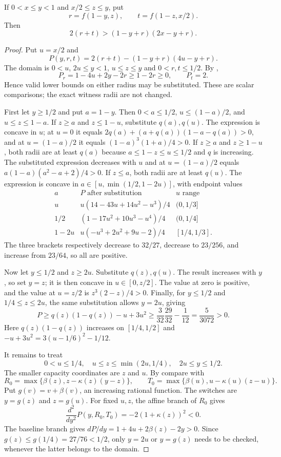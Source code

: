 \begin{lemma}
\label{lem:bc-coupled-capacity}
If $0<x\le y<1$ and $x/2\le z\le y$, put
\[
 r=f(1-y,z),\qquad t=f(1-z,x/2).
\]
Then
\[
 2(r+t)>(1-y+r)(2x-y+r).
\]
\end{lemma}
\begin{proof}
Put $u=x/2$ and
\[
 P(y,r,t)=2(r+t)-(1-y+r)(4u-y+r).
\]
The domain is $0<u$, $2u\le y<1$, $u\le z\le y$ and
$0<r,t\le1/2$. By ,
\[
 P_r=1-4u+2y-2r\ge1-2r\ge0,\qquad P_t=2.
\]
Hence valid lower bounds on either radius may be substituted. These are
scalar comparisons; the exact witness radii are not changed.

First let $y\ge1/2$ and put $a=1-y$. Then $0<a\le1/2$,
$u\le(1-a)/2$, and $u\le z\le1-a$.
If $z\ge a$ and $z\le1-u$, substitute $q(a),q(u)$.
The expression is concave in $u$; at $u=0$ it equals
$2q(a)+(a+q(a))(1-a-q(a))>0$, and at $u=(1-a)/2$ it equals
$(1-a)^3(1+a)/4>0$.
If $z\ge a$ and $z\ge1-u$, both radii are at least $q(a)$ because
$a\le1-z\le u\le1/2$ and $q$ is increasing. The substituted expression
decreases with $u$ and at $u=(1-a)/2$ equals
$a(1-a)(a^2-a+2)/4>0$.
If $z\le a$, both radii are at least $q(u)$. The expression is concave
in $a\in[u,\min(1/2,1-2u)]$, with endpoint values
\[
\begin{array}{c|c|c}
a&P\text{ after substitution}&u\text{ range}\\\hline
u&u(14-43u+14u^2-u^3)/4&(0,1/3]\\
1/2&(1-17u^2+10u^3-u^4)/4&(0,1/4]\\
1-2u&u(-u^3+2u^2+9u-2)/4&[1/4,1/3].
\end{array}
\]
The three brackets respectively decrease to $32/27$, decrease to
$23/256$, and increase from $23/64$, so all are positive.

Now let $y\le1/2$ and $z\ge2u$. Substitute $q(z),q(u)$.
The result increases with $y$, so set $y=z$; it is then concave in
$u\in[0,z/2]$. The value at zero is positive, and the value at
$u=z/2$ is $z^3(2-z)/4>0$.
Finally, for $y\le1/2$ and $1/4\le z\le2u$, the same substitution
allows $y=2u$, giving
\[
 P\ge q(z)(1-q(z))-u+3u^2
 \ge\frac3{32}\frac{29}{32}-\frac1{12}=\frac5{3072}>0.
\]
Here $q(z)(1-q(z))$ increases on $[1/4,1/2]$ and
$-u+3u^2=3(u-1/6)^2-1/12$.

It remains to treat
\[
 0<u\le1/4,\quad u\le z\le\min(2u,1/4),\quad 2u\le y\le1/2.
\]
The smaller capacity coordinates are $z$ and $u$. By
 compare with
\[
 R_0=\max\{\beta(z),z-\kappa(z)(y-z)\},\qquad
 T_0=\max\{\beta(u),u-\kappa(u)(z-u)\}.
\]
Put $g(v)=v+\beta(v)$, an increasing rational function. The switches are
$y=g(z)$ and $z=g(u)$.
For fixed $u,z$, the affine branch of $R_0$ gives
\[
 \frac{d^2}{dy^2}P(y,R_0,T_0)=-2(1+\kappa(z))^2<0.
\]
The baseline branch gives $dP/dy=1+4u+2\beta(z)-2y>0$.
Since $g(z)\le g(1/4)=27/76<1/2$, only $y=2u$ or $y=g(z)$
needs to be checked, whenever the latter belongs to the domain.


\end{proof}
